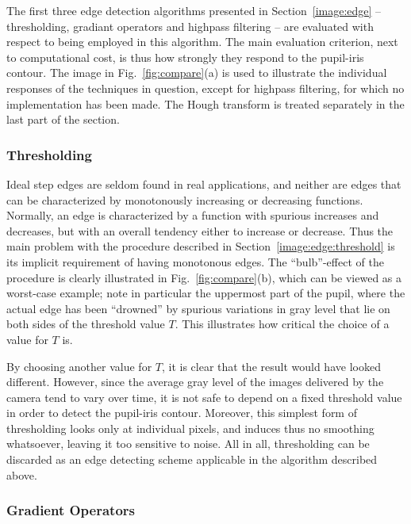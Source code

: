 The first three edge detection algorithms presented in
Section~\ref{image:edge} -- thresholding, gradiant operators and
highpass filtering -- are evaluated with respect to being employed in
this algorithm.  The main evaluation criterion, next to computational
cost, is thus how strongly they respond to the pupil-iris contour. The
image in Fig.~\ref{fig:compare}(a) is used to illustrate the individual
responses of the techniques in question, except for highpass
filtering, for which no implementation has been made.  The Hough
transform is treated separately in the last part of the section.

\subsubsection{Thresholding}

Ideal step edges are seldom found in real applications, and neither
are edges that can be characterized by monotonously increasing or
decreasing functions.  Normally, an edge is characterized by a
function with spurious increases and decreases, but with an overall
tendency either to increase or decrease.  Thus the main problem with
the procedure described in Section~\ref{image:edge:threshold} is its
implicit requirement of having monotonous edges.  The ``bulb''-effect
of the procedure is clearly illustrated in Fig.~\ref{fig:compare}(b),
which can be viewed as a worst-case example; note in particular the
uppermost part of the pupil, where the actual edge has been
``drowned'' by spurious variations in gray level that lie on both
sides of the threshold value $T$.  This illustrates how critical the
choice of a value for $T$ is.

By choosing another value for $T$, it is clear that the result would
have looked different.  However, since the average gray level of the
images delivered by the camera tend to vary over time, it is not safe
to depend on a fixed threshold value in order to detect the pupil-iris
contour.  Moreover, this simplest form of thresholding looks only at
individual pixels, and induces thus no smoothing whatsoever, leaving
it too sensitive to noise.  All in all, thresholding can be discarded
as an edge detecting scheme applicable in the algorithm described
above.

\subsubsection{Gradient Operators}


